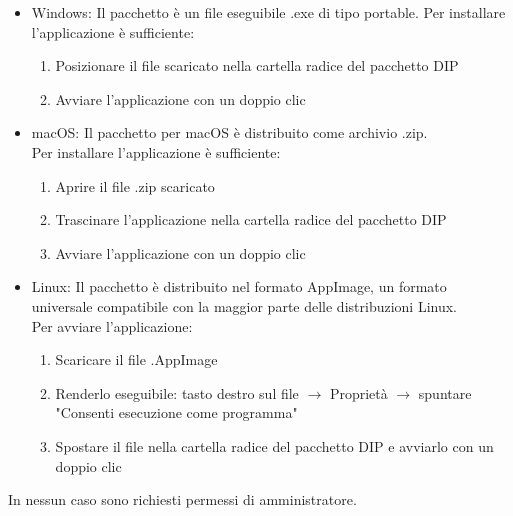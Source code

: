\documentclass[a4paper,12pt]{article}
\begin{document}
            \begin{itemize}
                \item Windows: Il pacchetto è un file eseguibile .exe di tipo portable.
                    Per installare l'applicazione è sufficiente:
                    \begin{enumerate}
                        \item Posizionare il file scaricato nella cartella radice del pacchetto DIP
                        \item Avviare l'applicazione con un doppio clic
                    \end{enumerate}

                \item macOS: Il pacchetto per macOS è distribuito come archivio .zip. \\
                    Per installare l'applicazione è sufficiente:
                    \begin{enumerate}
                        \item Aprire il file .zip scaricato
                        \item Trascinare l'applicazione nella cartella radice del pacchetto DIP
                        \item Avviare l'applicazione con un doppio clic
                    \end{enumerate}

                \item Linux: Il pacchetto è distribuito nel formato AppImage, un formato universale compatibile con la maggior parte delle distribuzioni Linux. \\
                    Per avviare l'applicazione:
                    \begin{enumerate}
                        \item Scaricare il file .AppImage
                        \item Renderlo eseguibile: tasto destro sul file $\rightarrow$ Proprietà $\rightarrow$ spuntare "Consenti esecuzione come programma"
                        \item Spostare il file nella cartella radice del pacchetto DIP e avviarlo con un doppio clic
                    \end{enumerate}
            \end{itemize}

            In nessun caso sono richiesti permessi di amministratore.
\end{document}

